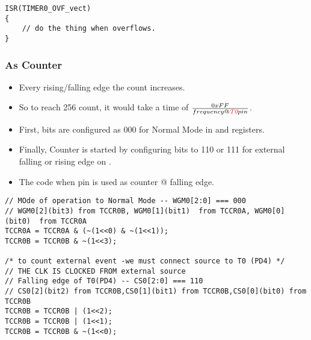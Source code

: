 \begin{verbatim}
ISR(TIMER0_OVF_vect)
{
    // do the thing when overflows.
}
\end{verbatim}


\subsubsection{As Counter}
\begin{itemize}
    \item Every rising/falling edge the count increases.
    \item So to reach 256 count, it would take a time of $\frac{0xFF}{frequency @ \emph{\textcolor{red}{T0}} pin}$.
    \item First,  bits are configured as 000 for Normal Mode in  and  registers.
    \item Finally, Counter is started by configuring  bits to 110 or 111 for external falling or rising edge on .
    \item The code when  pin is used as counter @ falling edge.
\end{itemize}

\begin{verbatim}
// MOde of operation to Normal Mode -- WGM0[2:0] === 000
// WGM0[2](bit3) from TCCR0B, WGM0[1](bit1)  from TCCR0A, WGM0[0](bit0)  from TCCR0A
TCCR0A = TCCR0A & (~(1<<0) & ~(1<<1));
TCCR0B = TCCR0B & ~(1<<3);
    
/* to count external event -we must connect source to T0 (PD4) */
// THE CLK IS CLOCKED FROM external source
// Falling edge of T0(PD4) -- CS0[2:0] === 110
// CS0[2](bit2) from TCCR0B,CS0[1](bit1) from TCCR0B,CS0[0](bit0) from TCCR0B
TCCR0B = TCCR0B | (1<<2);
TCCR0B = TCCR0B | (1<<1);
TCCR0B = TCCR0B & ~(1<<0);	
\end{verbatim}

